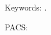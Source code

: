 \thispagestyle{empty}
{\fontsize{10}{12}\selectfont \bfseries \MakeUppercase \CompleteTitlePaper \par}

\fontsize{10}{12}\selectfont
\AuthorsTable

\EmailAuthorPaper



\AbstractPaper

Keywords: \KeywordsPaper\xspace.

PACS: \PACSPaper\par

